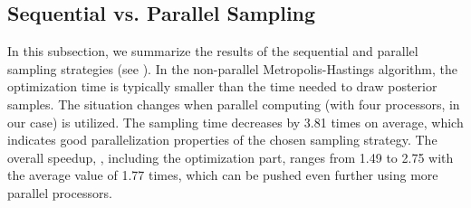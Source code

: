 \subsection{Sequential vs. Parallel Sampling}
In this subsection, we summarize the results of the sequential and parallel  sampling strategies (see ).
In the non-parallel Metropolis-Hastings algorithm, the optimization time is typically smaller than the time needed to draw posterior samples.
The situation changes when parallel computing (with four processors, in our case) is utilized. The sampling time decreases by 3.81 times on average, which indicates good parallelization properties of the chosen sampling strategy.
The overall speedup, \ie, including the optimization part, ranges from 1.49 to 2.75 with the average value of 1.77 times, which can be pushed even further using more parallel processors.
